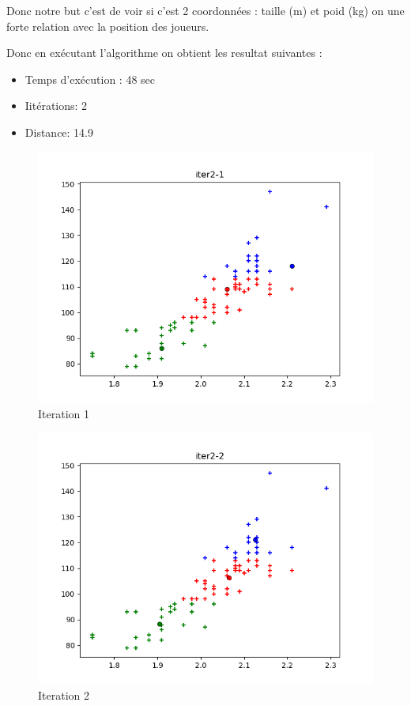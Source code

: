 \documentclass[french]{article}
\begin{document}
Donc notre but c'est de voir si c'est 2 coordonnées : taille (m) et poid (kg) on une forte relation avec la position des joueurs.

Donc en exécutant l'algorithme on obtient les resultat suivantes : 
\begin{itemize}
\item Temps d'exécution : 48 sec
\item Iitérations: 2
\item Distance: 14.9
\end{itemize}

\begin{figure}[h!]
\centering
\includegraphics[width=\linewidth]{img/nba-iter1.png}
\caption{Iteration 1}
\end{figure}
\newpage

\begin{figure}[h!]
\centering
\includegraphics[width=\linewidth]{img/nba-iter2.png}
\caption{Iteration 2}
\end{figure}
\end{document}
